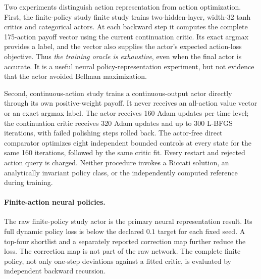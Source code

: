 Two experiments distinguish action representation from action optimization. First, the finite-policy study finite study trains two-hidden-layer, width-32 tanh critics and categorical actors. At each backward step it computes the complete 175-action payoff vector using the current continuation critic. Its exact argmax provides a label, and the vector also supplies the actor's expected action-loss objective. Thus \emph{the training oracle is exhaustive}, even when the final actor is accurate. It is a useful neural policy-representation experiment, but not evidence that the actor avoided Bellman maximization.

Second, continuous-action study trains a continuous-output actor directly through its own positive-weight payoff. It never receives an all-action value vector or an exact argmax label. The actor receives 160 Adam updates per time level; the continuation critic receives 320 Adam updates and up to 300 L-BFGS iterations, with failed polishing steps rolled back. The actor-free direct comparator optimizes eight independent bounded controls at every state for the same 160 iterations, followed by the same critic fit. Every restart and rejected action query is charged. Neither procedure invokes a Riccati solution, an analytically invariant policy class, or the independently computed reference during training.

\paragraph*{Finite-action neural policies.}
The raw finite-policy study actor is the primary neural representation result. Its full dynamic policy loss is below the declared $0.1$ target for each fixed seed. A top-four shortlist and a separately reported correction map further reduce the loss. The correction map is not part of the raw network. The complete finite policy, not only one-step deviations against a fitted critic, is evaluated by independent backward recursion.


